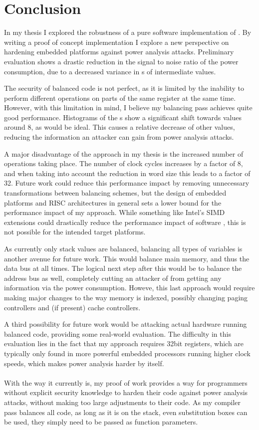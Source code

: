 \section{Conclusion}
\label{conclusion}
In my thesis I explored the robustness of a pure software implementation of \dual{}.
By writing a proof of concept implementation I explore a new perspective on hardening embedded platforms against power analysis attacks.
Preliminary evaluation shows a drastic reduction in the signal to noise ratio of the power consumption, due to a decreased variance in \hammingw{}s of intermediate values.

The security of balanced code is not perfect, as it is limited by the inability to perform different operations on parts of the same register at the same time.
However, with this limitation in mind, I believe my balancing pass achieves quite good performance.
Histograms of the \hammingw{}s show a significant shift towards values around 8, as would be ideal.
This causes a relative decrease of other values, reducing the information an attacker can gain from power analysis attacks.

A major disadvantage of the approach in my thesis is the increased number of operations taking place.
The number of clock cycles increases by a factor of 8, and when taking into account the reduction in word size this leads to a factor of 32.
Future work could reduce this performance impact by removing unnecessary transformations between balancing schemes, but the design of embedded platforms and RISC architectures in general sets a lower bound for the performance impact of my approach.
While something like Intel's SIMD extensions\cite{lomont2011introduction} could drastically reduce the performance impact of software \dual{}, this is not possible for the intended target platforms.

As currently only stack values are balanced, balancing all types of variables is another avenue for future work.
This would balance main memory, and thus the data bus at all times.
The logical next step after this would be to balance the address bus as well, completely cutting an attacker of from getting any information via the power consumption.
Howeve, this last approach would require making major changes to the way memory is indexed, possibly changing paging controllers and (if present) cache controllers.

A third possibility for future work would be attacking actual hardware running balanced code, providing some real-world evaluation.
The difficulty in this evaluation lies in the fact that my approach requires 32bit registers, which are typically only found in more powerful embedded processors running higher clock speeds, which makes power analysis harder by itself.
\\
\\
With the way it currently is, my proof of work provides a way for programmers without explicit security knowledge to harden their code against power analysis attacks, without making too large adjustments to their code.
As my compiler pass balances all code, as long as it is on the stack, even substitution boxes can be used, they simply need to be passed as function parameters.

